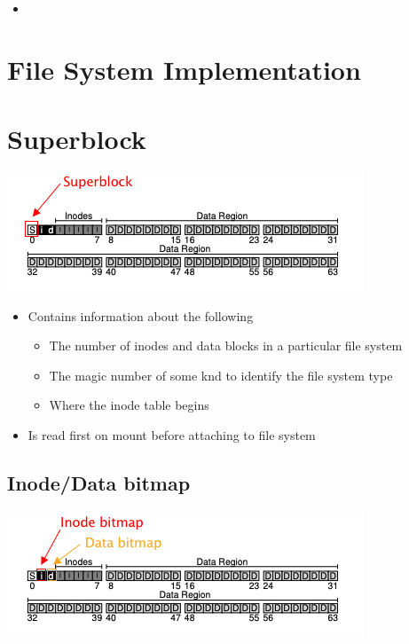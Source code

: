 \documentclass[12pt]{article}
\begin{document}
\begin{itemize}
    \item
\end{itemize}

\section{File System Implementation}

\section{Superblock}

\begin{center}
\includegraphics[width=\linewidth]{../images/midterm_2_solution_21.png}
\end{center}

\begin{itemize}
    \item Contains information about the following
    \begin{itemize}
        \item The number of inodes and data blocks in a particular file system
        \item The magic number of some knd to identify the file system type
        \item Where the inode table begins
    \end{itemize}

    \item Is read first on mount before attaching to file system
\end{itemize}


\subsection{Inode/Data bitmap}

\begin{center}
\includegraphics[width=\linewidth]{../images/midterm_2_solution_22.png}
\end{center}
\end{document}
